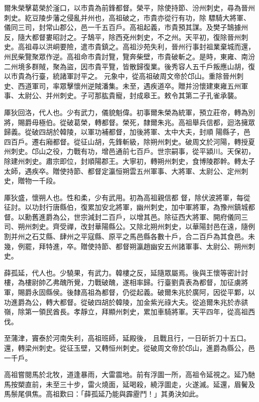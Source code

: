 \begin{pinyinscope}
 爾朱榮擊葛榮於滏口，以市貴為前鋒都督。榮平，除使持節、汾州刺史，尋為晉州刺史。紇豆陵步藩之侵亂并州也，高祖破之，市貴亦從行有功，除
 驃騎大將軍、儀同三司，封常山郡公，邑一千五百戶。高祖起義，市貴預其謀。及樊子鵠據州反，隨大都督婁昭討之。子鵠平，除西兗州刺史，不之州。天平初，復除晉州刺史。高祖尋以洪峒要險，遣市貴鎮之。高祖沙苑失利，晉州行事封祖業棄城而還，州民柴覽聚眾作逆。高祖命市貴討覽，覽奔柴壁，市貴破斬之。是時，東雍、南汾二州境多群賊，聚為盜，因市貴平覽，皆散歸復業。後秀容人五千戶叛應山胡，復以市貴為行臺，統諸軍討平之。
 元象中，從高祖破周文帝於邙山。重除晉州刺史、西道軍司，率眾擊懷州逆賊潘集。未至，遇疾道卒。贈并汾懷建東雍五州軍事、太尉公、并州刺史。子可那肱貴寵，封成皋王。敕令其第二子孔雀承襲。



 厙狄回洛，代人也。少有武力，儀貌魁偉。初事爾朱榮為統軍，預立莊帝，轉為別將，賜爵毋極伯。從破葛榮，轉都督。榮死，隸爾朱兆。高祖舉兵信都，迴洛擁眾歸義。從破四胡於韓陵，以軍功補都督，加後將軍、太中大夫，封順
 陽縣子，邑四百戶。遷右廂都督。從征山胡，先鋒斬級，除朔州刺史。破周文於河陽，轉授夏州刺史。邙山之役，力戰有功，增邑通前七百戶。世宗嗣事，從平潁川。天保初，除建州刺史。肅宗即位，封順陽郡王。大寧初，轉朔州刺史，食博陵郡幹。轉太子太師，遇疾卒。贈使持節、都督定瀛恒朔雲五州軍事、大將軍、太尉公、定州刺史，贈物一千段。



 厙狄盛，懷朔人也。性和柔，少有武用。初為高祖親信都
 督，除伏波將軍，每從征討。以功封行唐縣伯，復累加安北將軍，幽州刺史，加中軍將軍，為豫州鎮城都督。以勳舊進爵為公，世宗減封二百戶，以增其邑。除征西大將軍、開府儀同三司、朔州刺史。齊受禪，改封華陽縣公。又除北朔州刺史，以華陽封邑在遠，隨例割并州之石艾縣、肆州之平寇縣、原平之馬邑縣各數十戶，合二百戶為其食邑。未幾，例罷，拜特進，卒。贈使持節、都督朔瀛趙幽安五州諸軍事、太尉公、朔州刺史。



 薛孤延，代人也。少驍果，有武力。韓樓之反，延隨眾屬焉。後與王懷等密計討樓，為樓尉帥乙弗醜所覺，力戰破醜，遂相率歸。行臺劉貴表為都督，加征虜將軍，賜爵永固縣侯。後隸高祖為都督，仍從起義。破爾朱兆於廣阿，因從平鄴，以功進爵為公，轉大都督。從破四胡於韓陵，加金紫光祿大夫。從追爾朱兆於赤谼嶺，除第一領民酋長。孝靜立，拜顯州刺史，累加車騎將軍。天平四年，從高祖西伐。



 至蒲津，竇泰於河南失利，高祖班師，延殿後，
 且戰且行，一日斫折刀十五口。還，轉梁州刺史。從征玉壁，又轉恒州刺史。從破周文帝於邙山，進爵為縣公，邑一千戶。



 高祖嘗閱馬於北牧，道逢暴雨，大雷震地。前有浮圖一所，高祖令延視之。延乃馳馬按槊直前，未至三十步，雷火燒面，延喝殺，繞浮圖走，火遂滅。延還，眉鬢及馬鬃尾俱焦。高祖歎曰：「薛孤延乃能與霹靂鬥！」其勇決如此。




\end{pinyinscope}
